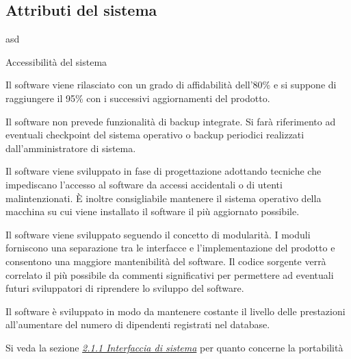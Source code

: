 \documentclass{scrreprt}
\begin{document}
	
	\subsection{Attributi del sistema}
	\begin{labeling}{asd}
	\item
	\begin{labeling}{Accessibilità del sistema}
		
		\item [Affidabilità]
			Il software viene rilasciato con un grado di affidabilità dell'80\% e si suppone di raggiungere il 95\% con i successivi aggiornamenti del prodotto.
		
		\item [Accessibilità del sistema]
			Il software non prevede funzionalità di backup integrate. Si farà riferimento ad eventuali checkpoint del sistema operativo o backup periodici realizzati dall'amministratore di sistema.
		
		\item [Sicurezza]
			Il software viene sviluppato in fase di progettazione adottando tecniche che impediscano l'accesso al software da accessi accidentali o di utenti malintenzionati. È inoltre consigliabile mantenere il sistema operativo della macchina su cui viene installato il software il più aggiornato possibile.
		
		\item [Mantenibilità]
			Il software viene sviluppato seguendo il concetto di modularità. I moduli forniscono una separazione tra le interfacce e l'implementazione del prodotto e consentono una maggiore mantenibilità del software. Il codice sorgente verrà correlato il più possibile da commenti significativi per permettere ad eventuali futuri sviluppatori di riprendere lo sviluppo del software.
		
		\item [Scalabilità]
			Il software è sviluppato in modo da mantenere costante il livello delle prestazioni all'aumentare del numero di dipendenti registrati nel database.
		
		\item [Portabilità]
			Si veda la sezione \hyperref[sec:inquadramento]{\textit{2.1.1 Interfaccia di sistema}} per quanto concerne la portabilità
	\end{labeling}
	\end{labeling}
\end{document}

